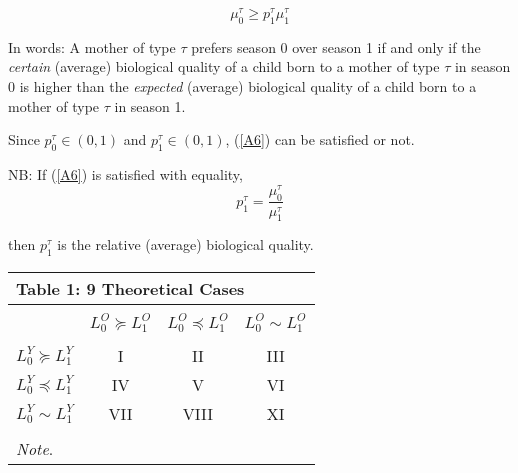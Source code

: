\documentclass[a4paper, 11 pt]{article}
\theoremstyle{plain}
\begin{document}
\begin{spacing}{1.2}
\begin{equation}\label{A6}
     \mu_0^{\tau}  \geq p_1^{\tau} \mu_1^{\tau}
\end{equation}

In words: A mother of type $\tau$ prefers season 0 over season 1 if and only if the \emph{certain} (average) biological quality of a child born to a mother of type $\tau$ in season 0 is higher than the \emph{expected} (average) biological quality of a child born to a mother of type $\tau$ in season 1.

Since $p_0^{\tau} \in (0,1)$ and $p_1^{\tau} \in (0,1)$, (\ref{A6}) can be satisfied or not.

NB: If (\ref{A6}) is satisfied with equality,
\begin{equation}\label{A7}
   p_1^{\tau} = \frac{\mu_0^{\tau}}{\mu_1^{\tau}}
\end{equation}

then $p_1^{\tau}$ is the relative (average) biological quality.


\clearpage

\begin{center}
\begin{table}[t]\centering
\begin{tabular}{lccc} \hline \hline
\multicolumn{4}{l}{\textbf{Table 1: 9 Theoretical Cases}} \\ \hline \\[1ex]
                                      & $L_0^{O} \succeq L_1^{O}$ &  $L_0^{O} \preceq L_1^{O}$ &  $L_0^{O} \sim L_1^{O}$  \\ \hline \\ [1ex]
   $L_0^{Y} \succeq L_1^{Y}$          &             I                   &               II                 &           III                   \\[2ex]
   $L_0^{Y} \preceq L_1^{Y}$          &             IV                  &               V                  &           VI                      \\[2ex]
   $L_0^{Y} \sim L_1^{Y}$             &             VII                 &               VIII               &            XI                   \\[2ex]
                                      &                                 &                                  &                                 \\%
\hline %
\multicolumn{4}{l}{\emph{Note}.}\\
\end{tabular}
\end{table}
\end{center}


\end{spacing}
\end{document}
